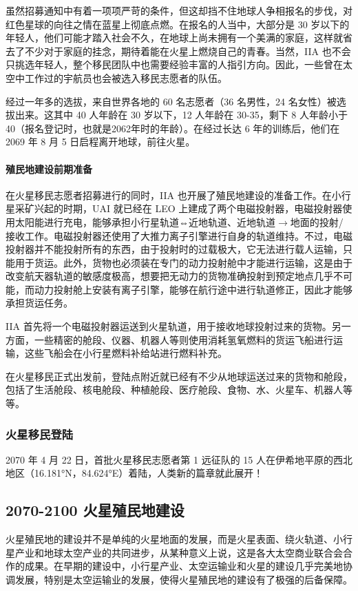 \documentclass[letterpaper,10pt]{sphinxmanual}
\begin{document}
虽然招募通知中有着一项项严苛的条件，但这却挡不住地球人争相报名的步伐，对红色星球的向往之情在蓝星上彻底点燃。在报名的人当中，大部分是 30 岁以下的年轻人，他们可能才踏入社会不久，在地球上尚未拥有一个美满的家庭，这样就省去了不少对于家庭的挂念，期待着能在火星上燃烧自己的青春。当然，IIA 也不会只挑选年轻人，整个移民团队中也需要经验丰富的人指引方向。因此，一些曾在太空中工作过的宇航员也会被选入移民志愿者的队伍。

经过一年多的选拔，来自世界各地的 60 名志愿者（36 名男性，24 名女性）被选拔出来。这其中 40 人年龄在 30 岁以下，12 人年龄在 30-35，剩下 8 人年龄小于40（报名登记时，也就是2062年时的年龄）。在经过长达 6 年的训练后，他们在 2069 年 8 月 5 日启程离开地球，前往火星。


\paragraph{殖民地建设前期准备}
\label{history:id17}
在火星移民志愿者招募进行的同时，IIA 也开展了殖民地建设的准备工作。在小行星采矿兴起的时期，UAI 就已经在 LEO 上建成了两个电磁投射器，电磁投射器使用太阳能进行充电，能够承担小行星轨道⇔近地轨道、近地轨道\(\rightarrow\)地面的投射/接收工作。电磁投射器还使用了大推力离子引擎进行自身的轨道维持。不过，电磁投射器并不能投射所有的东西，由于投射时的过载极大，它无法进行载人运输，只能用于货运。此外，货物也必须装在专门的动力投射舱中才能进行运输，这是由于改变航天器轨道的敏感度极高，想要把无动力的货物准确投射到预定地点几乎不可能，而动力投射舱上安装有离子引擎，能够在航行途中进行轨道修正，因此才能够承担货运任务。

IIA 首先将一个电磁投射器运送到火星轨道，用于接收地球投射过来的货物。另一方面，一些精密的舱段、仪器、机器人等则使用消耗氢氧燃料的货运飞船进行运输，这些飞船会在小行星燃料补给站进行燃料补充。

在火星移民正式出发前，登陆点附近就已经有不少从地球运送过来的货物和舱段，包括了生活舱段、核电舱段、种植舱段、医疗舱段、食物、水、火星车、机器人等等。


\subsubsection{火星移民登陆}
\label{history:id18}
2070 年 4 月 22 日，首批火星移民志愿者第 1 远征队的 15 人在伊希地平原的西北地区（16.181°N，84.624°E）着陆，人类新的篇章就此展开！
\begin{figure}[htbp]
\centering
\end{figure}


\subsection{2070-2100 火星殖民地建设}
\label{history:id19}
火星殖民地的建设并不是单纯的火星地面的发展，而是火星表面、绕火轨道、小行星产业和地球太空产业的共同进步，从某种意义上说，这是各大太空商业联合会合作的成果。在早期的建设中，小行星产业、太空运输业和火星的建设几乎完美地协调发展，特别是太空运输业的发展，使得火星殖民地的建设有了极强的后备保障。
\end{document}
